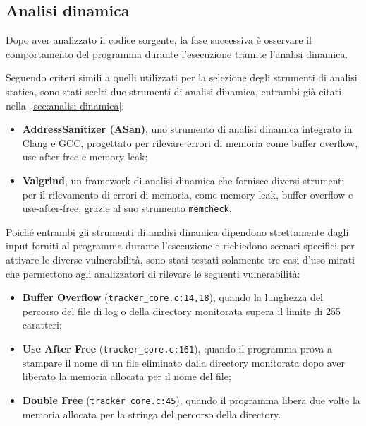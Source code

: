 \subsection*{Analisi dinamica}
Dopo aver analizzato il codice sorgente, la fase successiva è osservare il comportamento
del programma durante l'esecuzione tramite l'analisi dinamica.

Seguendo criteri simili a quelli utilizzati per la selezione degli strumenti di analisi
statica, sono stati scelti due strumenti di analisi dinamica, entrambi già citati
nella~\autoref{sec:analisi-dinamica}:
\begin{itemize}
  \item \textbf{AddressSanitizer (ASan)}, uno strumento di analisi dinamica integrato
    in Clang e GCC, progettato per rilevare errori di memoria come buffer
    overflow, use-after-free e memory leak;

  \item \textbf{Valgrind}, un framework di analisi dinamica che fornisce diversi
    strumenti per il rilevamento di errori di memoria, come memory leak, buffer overflow
    e use-after-free, grazie al suo strumento \texttt{memcheck}.
\end{itemize}

\noindent
Poiché entrambi gli strumenti di analisi dinamica dipendono strettamente dagli input
forniti al programma durante l'esecuzione e richiedono scenari specifici per attivare
le diverse vulnerabilità, sono stati testati solamente tre casi d'uso mirati che
permettono agli analizzatori di rilevare le seguenti vulnerabilità:
\begin{itemize}
  \item \textbf{Buffer Overflow} (\texttt{tracker\_core.c:14,18}), quando la
    lunghezza del percorso del file di log o della directory monitorata supera
    il limite di 255 caratteri;

  \item \textbf{Use After Free} (\texttt{tracker\_core.c:161}), quando il
    programma prova a stampare il nome di un file eliminato dalla directory
    monitorata dopo aver liberato la memoria allocata per il nome del file;

  \item \textbf{Double Free} (\texttt{tracker\_core.c:45}), quando il programma
    libera due volte la memoria allocata per la stringa del percorso della
    directory.
\end{itemize}

